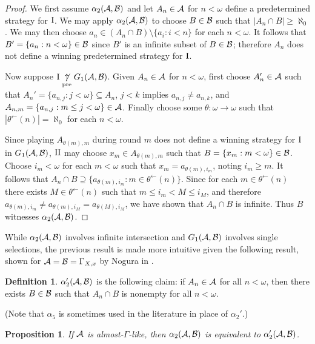 \documentclass{amsart}
\theoremstyle{plain}
\newtheorem{proposition}[theorem]{Proposition}
\theoremstyle{definition}
\newtheorem{definition}[theorem]{Definition}
\theoremstyle{remark}
\theoremstyle{plain}
\theoremstyle{definition}
\theoremstyle{remark}
\begin{document}
\begin{proof}
We first assume \(\alpha_2(\mathcal{A},\mathcal{B})\) and let \(A_n\in\mathcal{A}\) for \(n<\omega\)
define a predetermined strategy for \(\mathrm{I}\).
We may apply \(\alpha_2(\mathcal{A},\mathcal{B})\) to choose \(B\in\mathcal{B}\) such that
\(|A_n\cap B|\geq\aleph_0\). We may then choose \(a_n\in(A_n\cap B)\setminus\{a_i:i<n\}\)
for each \(n<\omega\). It follows that \(B'=\{a_n:n<\omega\}\in\mathcal{B}\) since
\(B'\) is an infinite subset of \(B\in\mathcal{B}\); therefore \(A_n\) does not define
a winning predetermined strategy for \(\mathrm{I}\).

Now suppose \(\mathrm{I}\underset{\text{pre}}{\not\uparrow} G_1(\mathcal{A},\mathcal{B})\). Given \(A_n\in\mathcal{A}\) for \(n<\omega\),
first choose \(A_n'\in\mathcal{A}\) such that \(A_n'=\{a_{n,j}:j<\omega\}\subseteq A_n\),
\(j<k\) implies \(a_{n,j}\not=a_{n,k}\),
and \(A_{n,m}=\{a_{n,j}:m\leq j<\omega\}\in\mathcal{A}\).
Finally choose
some \(\theta:\omega\to\omega\) such that \(|\theta^{\leftarrow}(n)|=\aleph_0\) for
each \(n<\omega\).

Since playing \(A_{\theta(m),m}\) during round \(m\)
does not define a winning strategy for \(\mathrm{I}\) in
\(G_1(\mathcal{A},\mathcal{B})\), \(\mathrm{II}\) may choose \(x_m\in A_{\theta(m),m}\)
such that \(B=\{x_m:m<\omega\}\in\mathcal{B}\).
Choose \(i_m<\omega\) for each \(m<\omega\) such that
\(x_m=a_{\theta(m),i_m}\), noting \(i_m\geq m\).
It follows that 
\(A_n\cap B\supseteq\{a_{\theta(m),i_m}:m\in\theta^{\leftarrow}(n)\}\).
Since for each \(m\in\theta^{\leftarrow}(n)\) there exists
\(M\in\theta^{\leftarrow}(n)\) such that \(m\leq i_m<M\leq i_{M}\),
and therefore \(a_{\theta(m),i_m}\not=a_{\theta(m),i_{M}}=a_{\theta(M),i_{M}}\),
we have shown that \(A_n\cap B\) is infinite. Thus \(B\) witnesses
\(\alpha_2(\mathcal{A},\mathcal{B})\).
\end{proof}

While \(\alpha_2(\mathcal{A},\mathcal{B})\) involves infinite intersection and
\(G_1(\mathcal{A},\mathcal{B})\) involves single selections, the previous result is made
more intuitive given the following result, shown for \(\mathcal{A}=\mathcal{B}=\Gamma_{X,x}\)
by Nogura in \cite{MR812643}.

\begin{definition}
\(\alpha_2'(\mathcal{A},\mathcal{B})\) is the following claim:
if \(A_n\in\mathcal{A}\) for all \(n<\omega\), then there exists \(B\in\mathcal{B}\) such that
\(A_n\cap B\) is nonempty for all \(n<\omega\).
\end{definition}

(Note that \(\alpha_5\) is sometimes used in the literature in place of \(\alpha_2'\).)

\begin{proposition}
If \(\mathcal{A}\) is almost-\(\Gamma\)-like, then
\(\alpha_2(\mathcal{A},\mathcal{B})\) is equivalent to \(\alpha_2'(\mathcal{A},\mathcal{B})\).
\end{proposition}
\end{document}
